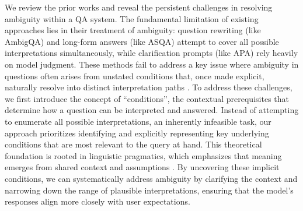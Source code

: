 We review the prior works and reveal the persistent challenges in resolving ambiguity within a QA system. The fundamental limitation of existing approaches lies in their treatment of ambiguity: question rewriting (like AmbigQA) and long-form answers (like ASQA) attempt to cover all possible interpretations simultaneously, while clarification prompts (like APA) rely heavily on model judgment. These methods fail to address a key issue where ambiguity in questions often arises from unstated conditions that, once made explicit, naturally resolve into distinct interpretation paths \cite{wasow2005puzzle}. To address these challenges, we first introduce the concept of {``conditions''}, the contextual prerequisites that determine how a question can be interpreted and answered. Instead of attempting to enumerate all possible interpretations, an inherently infeasible task, our approach prioritizes identifying and explicitly representing key underlying conditions that are most relevant to the query at hand. This theoretical foundation is rooted in linguistic pragmatics, which emphasizes that meaning emerges from shared context and assumptions \cite{grice1975logic,levinson1983pragmatics}.
By uncovering these implicit conditions, we can systematically address ambiguity by clarifying the context and narrowing down the range of plausible interpretations, ensuring that the model’s responses align more closely with user expectations.

